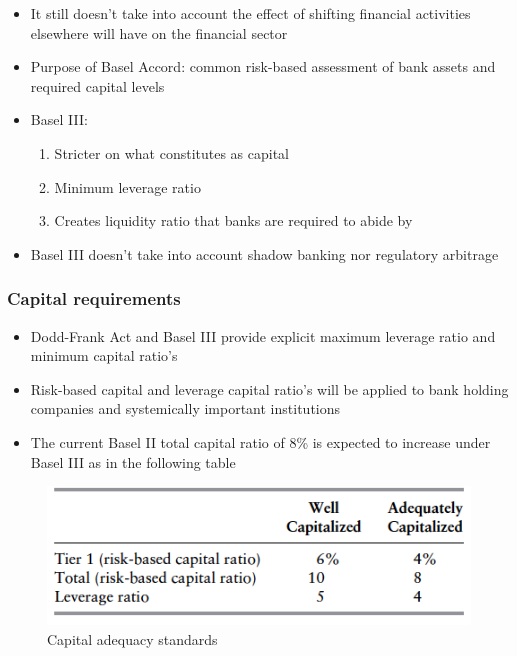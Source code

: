 \documentclass[11pt]{beamer}
\begin{document}
\begin{frame}
\begin{itemize}\itemsep10pt
\item It still doesn't take into account the effect of shifting financial activities elsewhere will have on the financial sector
\item Purpose of Basel Accord: common risk-based assessment of bank assets and required capital levels
\item Basel III:
\begin{enumerate}\itemsep5pt
\item Stricter on what constitutes as capital
\item Minimum leverage ratio
\item Creates liquidity ratio that banks are required to abide by
\end{enumerate}
\item Basel III doesn't take into account shadow banking nor regulatory arbitrage
\end{itemize}
\end{frame}

\begin{frame}
\frametitle{Capital requirements}
\begin{itemize}\itemsep10pt
\item Dodd-Frank Act and Basel III provide explicit maximum leverage ratio and minimum capital ratio's
\item Risk-based capital and leverage capital ratio's will be applied to bank holding companies and systemically important institutions
\item The current Basel II total capital ratio of 8\% is expected to increase under Basel III as in the following table
\end{itemize}
\end{frame}

\begin{frame}
\begin{figure}
\includegraphics[width=\textwidth]{6_1.png}
\caption{Capital adequacy standards}
\end{figure}
\end{frame}
\end{document}
